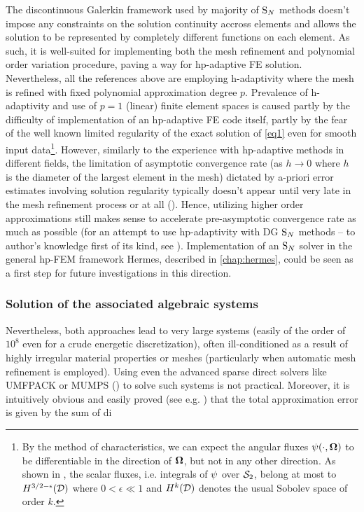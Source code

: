 The discontinuous Galerkin framework used by majority of $\text{S}_{N}$ methods doesn't impose any constraints on the solution
continuity accross elements and allows the solution to be represented by completely different functions on each element.
As such, it is well-suited for implementing both the mesh refinement and polynomial order variation procedure, paving a
way for hp-adaptive FE solution.
Nevertheless, all the references above are employing h-adaptivity where the mesh is refined with fixed polynomial
approximation degree $p$. Prevalence of h-adaptivity and use of $p=1$ (linear) finite element spaces is caused partly
by the difficulty of implementation of an hp-adaptive FE code itself, partly by the fear of the well known limited
regularity of the exact solution of \eqref{eq1} even for smooth input data\footnote{By the method of characteristics, we
can expect the angular fluxes $\psi(\cdot,\mathbf{\Omega})$ to be differentiable in the direction of $\mathbf{\Omega}$, but not in
any other direction. As shown in \cite{Johnson}, the scalar fluxes, i.e. integrals of $\psi$ over $\mathcal{S}_2$, belong
at most to $H^{3/2-\epsilon}(\mathcal{D})$ where $0 < \epsilon \ll 1$ and $H^{k}(\mathcal{D})$ denotes the usual Sobolev space of order
$k$.}.
However, similarly to the experience with hp-adaptive methods in different fields, the limitation of asymptotic
convergence rate (as $h\to 0$ where $h$ is the diameter of the largest element in the mesh) dictated by a-priori error
estimates involving solution regularity typically doesn't appear until very late in the mesh refinement process or at
all (\cite{wang2009convergence}). Hence, utilizing higher order approximations still makes sense to accelerate
pre-asymptotic convergence rate as much as possible (for an attempt to use hp-adaptivity with DG $\text{S}_{N}$ methods -- to
author's knowledge first of its kind, see \cite{FournierDGHP}). Implementation of an $\text{S}_{N}$ solver in the general hp-FEM
framework Hermes, described in \cref{chap:hermes}, could be seen as a first step for future investigations in this
direction.





  



\subsubsection{Solution of the associated algebraic systems}

Nevertheless, both approaches lead to very large systems (easily of the order of $10^8$ even for a crude energetic
discretization), often ill-conditioned as a result of highly irregular material properties or meshes
(particularly when automatic mesh refinement is employed). Using even the advanced sparse direct solvers like
UMFPACK or MUMPS (\cite{UMFPACK,MUMPS}) to solve such systems is not practical.
Moreover, it is intuitively obvious and easily proved (see e.g. \cite{Arioli}) that the total approximation error is
given by the sum of di

